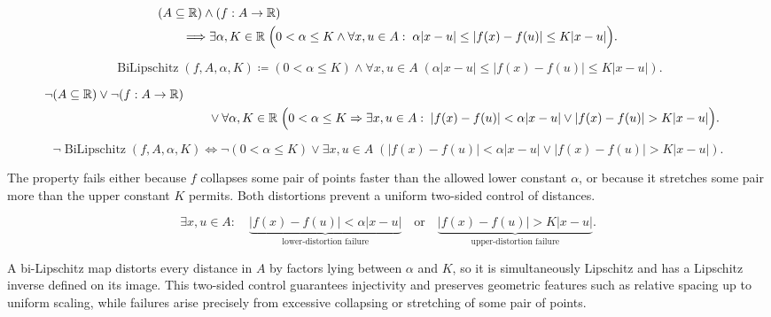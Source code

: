 \begin{remark*}
\[
\begin{aligned}
&(A\subseteq\mathbb{R})\land(f:A\to\mathbb{R})\\
&\qquad\Longrightarrow
\exists \alpha,K\in\mathbb{R}\;\Bigl(0<\alpha\le K
\land \forall x,u\in A:\; \alpha|x-u|\le |f(x)-f(u)|\le K|x-u|\Bigr).
\end{aligned}
\]
\end{remark*}

\begin{remark*}
\[
\operatorname{BiLipschitz}(f,A,\alpha,K) \coloneqq \left(0<\alpha\le K\right) \land \forall x,u\in A\; \left(\alpha|x-u|\le |f(x)-f(u)|\le K|x-u|\right).
\]
\end{remark*}

\begin{remark*}
\[
\begin{aligned}
\neg(A\subseteq\mathbb{R})\lor\neg(f:A\to\mathbb{R})\\
&\qquad\lor
\forall \alpha,K\in\mathbb{R}\;\Bigl(0<\alpha\le K \Rightarrow
\exists x,u\in A:\; |f(x)-f(u)|<\alpha|x-u| \lor |f(x)-f(u)|>K|x-u|\Bigr).
\end{aligned}
\]
\end{remark*}

\begin{remark*}
\[
\neg\operatorname{BiLipschitz}(f,A,\alpha,K) \Longleftrightarrow \neg(0<\alpha\le K) \lor \exists x,u\in A\; \left(|f(x)-f(u)|<\alpha|x-u| \lor |f(x)-f(u)|>K|x-u|\right).
\]
\end{remark*}

\begin{remark*}
The property fails either because $f$ collapses some pair of points faster than the allowed lower constant $\alpha$, or because it stretches some pair more than the upper constant $K$ permits. Both distortions prevent a uniform two-sided control of distances.
\end{remark*}

\begin{remark*}
\[
\exists x,u\in A:\quad
\underbrace{|f(x)-f(u)|<\alpha|x-u|}_{\text{lower-distortion failure}}
\quad\text{or}\quad
\underbrace{|f(x)-f(u)|>K|x-u|}_{\text{upper-distortion failure}}.
\]
\end{remark*}

\begin{remark*}[Interpretation]
A bi-Lipschitz map distorts every distance in $A$ by factors lying between $\alpha$ and $K$, so it is simultaneously Lipschitz and has a Lipschitz inverse defined on its image. This two-sided control guarantees injectivity and preserves geometric features such as relative spacing up to uniform scaling, while failures arise precisely from excessive collapsing or stretching of some pair of points.
\end{remark*}

